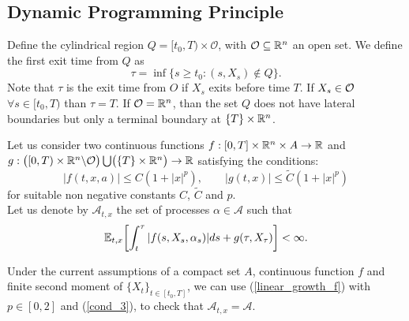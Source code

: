 \subsection{Dynamic Programming Principle}\label{DPP_section}

Define the cylindrical region $Q = [t_0,T) \times \mathcal{O}$, with $\mathcal{O} \subseteq \mathbb{R}^n$ an open set. 
We define the first exit time from $Q$ as 
\begin{equation}\label{exit_time_def}
 \tau = \inf \{ s \geq t_0: (s,X_s) \not\in Q \}. 
\end{equation}
Note that $\tau$ is the exit time from $O$ if $X_s$ exits before time $T$. If $X_s \in \mathcal{O}$ $\forall s \in [t_0,T)$ than $\tau = T$. If $\mathcal{O} = \mathbb{R}^n$, than the set $Q$ 
does not have lateral boundaries but only a terminal boundary at $\{ T \} \times \mathbb{R}^n$.

\noindent
Let us consider two continuous functions $f:[0,T]\times \mathbb{R}^n \times A \to \mathbb{R}$ and $g: \bigl( [0,T)\times \mathbb{R}^n \backslash \mathcal{O} \bigr) \bigcup \bigl( \{T\} \times \mathbb{R}^n \bigr) \to \mathbb{R}$ 
satisfying the conditions:
 \begin{equation}\label{linear_growth_f}
  |f(t,x,a)| \leq C (1+|x|^p), \quad \quad |g(t,x)| \leq \tilde C (1+|x|^p)
 \end{equation}
for suitable non negative constants $C$, $\tilde C$ and $p$.\\
Let us denote by $\mathcal{A}_{t,x}$ the set of processes $\alpha \in \mathcal{A}$ such that 
\begin{equation}
\mathbb{E}_{t,x} \biggl[ \int_{t}^{\tau} |f(s,X_s,\alpha_s)| ds + g(\tau, X_{\tau}) \biggr] < \infty. 
\end{equation}
\begin{Remark}
 Under the current assumptions of a compact set $A$, continuous function $f$ and finite second moment of $\{X_{t}\}_{t\in [t_0,T]}$, 
 we can use (\ref{linear_growth_f}) with $p\in [0,2]$ and (\ref{cond_3}), to check that $\mathcal{A}_{t,x} = \mathcal{A}$. 
\end{Remark}

